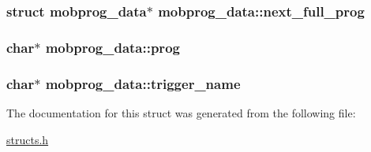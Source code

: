 \hypertarget{structmobprog__data_adba12d3319a1406d6ff96e3d2803efd0}{
\subsubsection[{next\-\_\-full\-\_\-prog}]{\setlength{\rightskip}{0pt plus 5cm}struct {\bf mobprog\-\_\-data}$\ast$ mobprog\-\_\-data\-::next\-\_\-full\-\_\-prog}}\label{structmobprog__data_adba12d3319a1406d6ff96e3d2803efd0}
\hypertarget{structmobprog__data_ad47f07fae4eb7e609d5afd35b2355b1d}{
\subsubsection[{prog}]{\setlength{\rightskip}{0pt plus 5cm}char$\ast$ mobprog\-\_\-data\-::prog}}\label{structmobprog__data_ad47f07fae4eb7e609d5afd35b2355b1d}
\hypertarget{structmobprog__data_a8c82dd5e0c02cf72982f88cd482cd974}{
\subsubsection[{trigger\-\_\-name}]{\setlength{\rightskip}{0pt plus 5cm}char$\ast$ mobprog\-\_\-data\-::trigger\-\_\-name}}\label{structmobprog__data_a8c82dd5e0c02cf72982f88cd482cd974}


The documentation for this struct was generated from the following file\-:\begin{DoxyCompactItemize}
\item 
\hyperlink{structs_8h}{structs.\-h}\end{DoxyCompactItemize}
